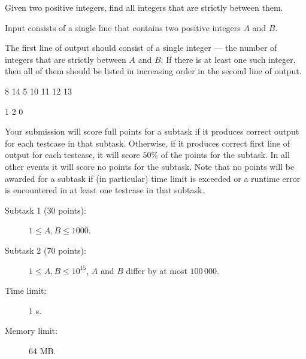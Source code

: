 \documentclass{boi2014}
\begin{document}
    Given two positive integers, find all integers that are strictly
    between them.

    \Input
    Input consists of a single line that contains two positive
    integers $A$ and $B$.

    \Output
    The first line of output should consist of a single integer ---
    the number of integers that are strictly between $A$ and $B$.
    If there is at least one such integer, then all of them should
    be listed in increasing order in the second line of output.
    
    \Examples

    \simpleexample
    {
        8 14
    }
    {
        5  10 11 12 13
    }

    \simpleexample
    {
        1 2
    }
    {
        0
    }

    \Scoring

        Your submission will score full points for a subtask if it
        produces correct output for each testcase in 
        that subtask. Otherwise, if it produces correct first
        line of output for each testcase, it will score $50\%$ of the
        points for the subtask. In all other events it will score no
        points for the subtask.
        Note that no points will be awarded for a subtask if
        (in particular) time
        limit is exceeded or a runtime error is encountered in at
        least one testcase in that subtask.

    \begin{description}

        \item[Subtask 1 (30 points):] $1 \le A, B \le 1000$. 
        \item[Subtask 2 (70 points):] $1 \le A, B \le 10^{15}$,
            $A$ and $B$ differ by at most $100\,000$.
    \end{description}

    \Constraints

    \begin{description}
        \item[Time limit:] 1 s.
        \item[Memory limit:] 64 MB.
    \end{description}
\end{document}
